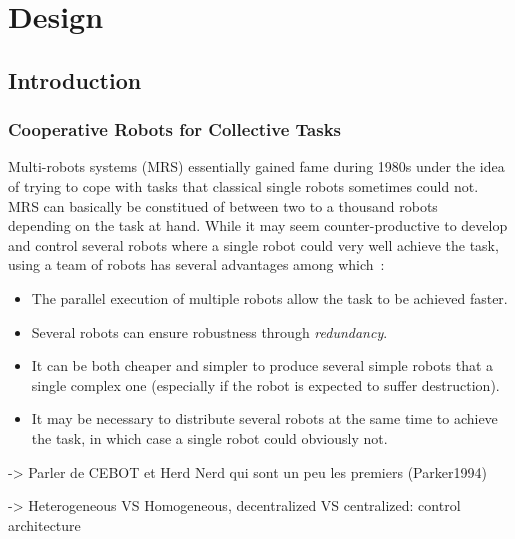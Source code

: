 \chapter{Design}
\label{chapter:design}


\minitoc[n] %

\section{Introduction}

  \subsection{Cooperative Robots for Collective Tasks}

    Multi-robots systems (MRS) essentially gained fame during 1980s under the idea of trying to cope with tasks that classical single robots sometimes could not. MRS can basically be constitued of between two to a thousand robots~\cite{Rubenstein2014} depending on the task at hand. While it may seem counter-productive to develop and control several robots where a single robot could very well achieve the task, using a team of robots has several advantages among which~\cite{Cao1997, Arkin1998}:

    \begin{itemize}
      \item{The parallel execution of multiple robots allow the task to be achieved faster.}
      \item{Several robots can ensure robustness through \emph{redundancy}.}
      \item{It can be both cheaper and simpler to produce several simple robots that a single complex one (especially if the robot is expected to suffer destruction).}
      \item{It may be necessary to distribute several robots at the same time to achieve the task, in which case a single robot could obviously not.}
    \end{itemize}

    -> Parler de CEBOT et Herd Nerd qui sont un peu les premiers (Parker1994)

    -> Heterogeneous VS Homogeneous, decentralized VS centralized: control architecture

